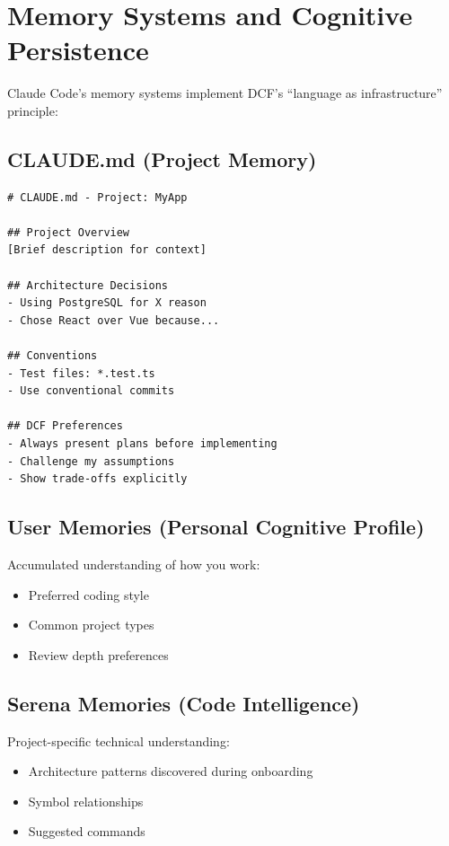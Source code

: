 \chapter{Memory Systems and Cognitive Persistence}

Claude Code's memory systems implement DCF's ``language as infrastructure'' principle:

\section{CLAUDE.md (Project Memory)}

\begin{lstlisting}
# CLAUDE.md - Project: MyApp

## Project Overview
[Brief description for context]

## Architecture Decisions
- Using PostgreSQL for X reason
- Chose React over Vue because...

## Conventions
- Test files: *.test.ts
- Use conventional commits

## DCF Preferences
- Always present plans before implementing
- Challenge my assumptions
- Show trade-offs explicitly
\end{lstlisting}

\section{User Memories (Personal Cognitive Profile)}

Accumulated understanding of how you work:
\begin{itemize}
    \item Preferred coding style
    \item Common project types
    \item Review depth preferences
\end{itemize}

\section{Serena Memories (Code Intelligence)}

Project-specific technical understanding:
\begin{itemize}
    \item Architecture patterns discovered during onboarding
    \item Symbol relationships
    \item Suggested commands
\end{itemize}

